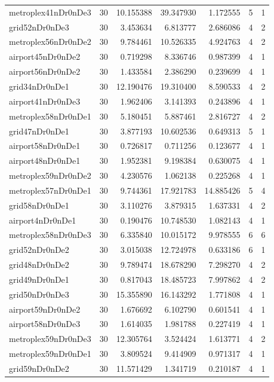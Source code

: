 \begin{longtable}{|l|r|r|r|r|r|r|}
metroplex41nDr0nDe3 & 30 & 10.155388 & 39.347930 & 1.172555 & 5 & 1 \\
grid52nDr0nDe3 & 30 & 3.453634 & 6.813777 & 2.686086 & 4 & 2 \\
metroplex56nDr0nDe2 & 30 & 9.784461 & 10.526335 & 4.924763 & 4 & 2 \\
airport45nDr0nDe2 & 30 & 0.719298 & 8.336746 & 0.987399 & 4 & 1 \\
airport56nDr0nDe2 & 30 & 1.433584 & 2.386290 & 0.239699 & 4 & 1 \\
grid34nDr0nDe1 & 30 & 12.190476 & 19.310400 & 8.590533 & 4 & 2 \\
airport41nDr0nDe3 & 30 & 1.962406 & 3.141393 & 0.243896 & 4 & 1 \\
metroplex58nDr0nDe1 & 30 & 5.180451 & 5.887461 & 2.816727 & 4 & 2 \\
grid47nDr0nDe1 & 30 & 3.877193 & 10.602536 & 0.649313 & 5 & 1 \\
airport58nDr0nDe1 & 30 & 0.726817 & 0.711256 & 0.123677 & 4 & 1 \\
airport48nDr0nDe1 & 30 & 1.952381 & 9.198384 & 0.630075 & 4 & 1 \\
metroplex59nDr0nDe2 & 30 & 4.230576 & 1.062138 & 0.225268 & 4 & 1 \\
metroplex57nDr0nDe1 & 30 & 9.744361 & 17.921783 & 14.885426 & 5 & 4 \\
grid58nDr0nDe1 & 30 & 3.110276 & 3.879315 & 1.637331 & 4 & 2 \\
airport4nDr0nDe1 & 30 & 0.190476 & 10.748530 & 1.082143 & 4 & 1 \\
metroplex58nDr0nDe3 & 30 & 6.335840 & 10.015172 & 9.978555 & 6 & 6 \\
grid52nDr0nDe2 & 30 & 3.015038 & 12.724978 & 0.633186 & 6 & 1 \\
grid48nDr0nDe2 & 30 & 9.789474 & 18.678290 & 7.298270 & 4 & 2 \\
grid49nDr0nDe1 & 30 & 0.817043 & 18.485723 & 7.997862 & 4 & 2 \\
grid50nDr0nDe3 & 30 & 15.355890 & 16.143292 & 1.771808 & 4 & 1 \\
airport59nDr0nDe2 & 30 & 1.676692 & 6.102790 & 0.601541 & 4 & 1 \\
airport58nDr0nDe3 & 30 & 1.614035 & 1.981788 & 0.227419 & 4 & 1 \\
metroplex59nDr0nDe3 & 30 & 12.305764 & 3.524424 & 1.613771 & 4 & 2 \\
metroplex59nDr0nDe1 & 30 & 3.809524 & 9.414909 & 0.971317 & 4 & 1 \\
grid59nDr0nDe2 & 30 & 11.571429 & 1.341719 & 0.210187 & 4 & 1 \\

\end{longtable}
